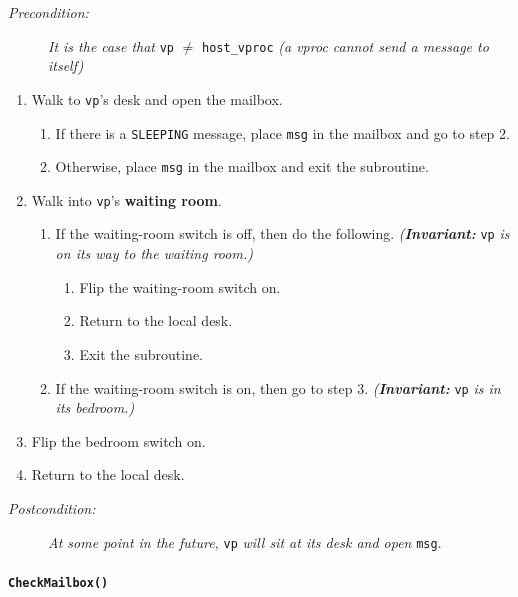 \documentclass[11pt]{article}
\begin{document}
{\begin{description}
\item [\textit{Precondition:}] \textit{It is the case that} \texttt{vp} $\neq$ \texttt{host\_vproc} \textit{(a vproc cannot send a message to itself)}
\end{description}

\begin{enumerate}
  \item Walk to \texttt{vp}'s desk and open the mailbox.
    \begin{enumerate}
      \item If there is a \texttt{SLEEPING} message, place \texttt{msg} in the mailbox and go to step 2.
      \item Otherwise, place \texttt{msg} in the mailbox and exit the subroutine.
    \end{enumerate}
  \item Walk into \texttt{vp}'s \textbf{waiting room}.
    \begin{enumerate}
      \item If the waiting-room switch is off, then do the following. \textit{(\textbf{Invariant:}} \texttt{vp} \textit{is on its way to the waiting room.)}
        \begin{enumerate}
          \item Flip the waiting-room switch on.
          \item Return to the local desk.
          \item Exit the subroutine.
        \end{enumerate}
      \item If the waiting-room switch is on, then go to step 3. \textit{(\textbf{Invariant:}} \texttt{vp} \textit{is in its bedroom.)}
    \end{enumerate}
  \item Flip the bedroom switch on.
  \item Return to the local desk.
\end{enumerate}

\begin{description}
\item [\textit{Postcondition:}] \textit{At some point in the future,} \texttt{vp} \textit{will sit at its desk and open} \texttt{msg}.
\end{description}

\paragraph{\texttt{CheckMailbox()}}

}
\end{document}
